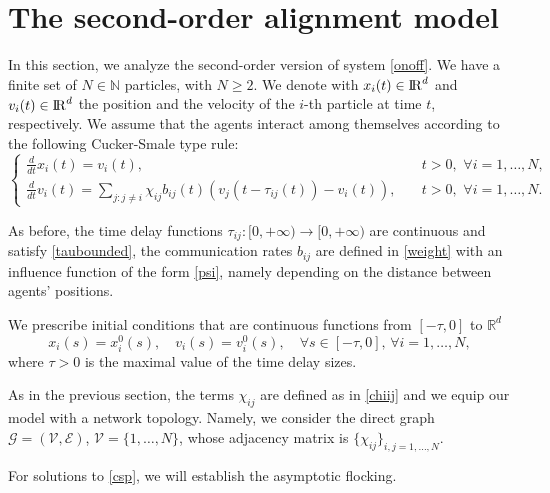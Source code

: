 \documentclass[11pt]{article}
\newcommand{\N}{\mathbb N}
\newcommand{\RR}{{{\rm I} \kern -.15em {\rm R} }}
\begin{document}
\section{The second-order alignment\label{4} model}\label{secdelay}
\setcounter{equation}{0}
	In this section, we analyze the second-order version of system \eqref{onoff}. We have a finite set of $N\in\N$ particles, with $N\geq 2 $. We denote with $x_{i}(t)\in \RR^d$ and $v_{i}(t)\in \RR^d$ the position and the velocity of the $i$-th particle at time $t$, respectively. We assume that the agents interact among themselves according to the following Cucker-Smale type rule:
	\begin{equation}\label{csp}
		\begin{cases}
			\frac{d}{dt}x_{i}(t)=v_{i}(t),\quad &t>0, \,\,\forall i=1,\dots,N,\\\frac{d}{dt}v_{i}(t)=\underset{j:j\neq i}{\sum}\chi_{ij}b_{ij}(t)(v_{j}(t-\tau_{ij}(t))-v_{i}(t)),\quad 	&t>0,\,\,\forall i=1,\dots,N.
		\end{cases}
	\end{equation}
	
	
	As before, the time delay functions $\tau_{ij}:[0,+\infty)\rightarrow[0,+\infty)$ are continuous and satisfy \eqref{taubounded}, the communication rates $b_{ij}$ are defined in \eqref{weight} with an influence function of the form \eqref{psi}, namely depending on the distance between agents' positions. 
	
	We prescribe initial conditions that are continuous functions from $[-\tau,0]$ to $\mathbb{R}^d$
	\begin{equation}\label{incondcs}
		x_{i}(s)=x^{0}_{i}(s),\quad v_{i}(s)=v^{0}_{i}(s), \quad \forall s\in [-\tau,0],\,\forall i=1,\dots,N,
	\end{equation}
	where $\tau>0$ is the maximal value of the time delay sizes. 
	
    \vspace{0.1cm}

    As in the previous section, the terms $\chi_{ij}$ are defined as in \eqref{chiij} and we equip our model with a network topology. Namely, we consider the direct graph $\mathcal{G}=(\mathcal{V},\mathcal{E})$, $\mathcal{V}=\{1,\dots,N\}$, whose adjacency matrix is $\{\chi_{ij} \}_{i,j=1,\dots,N}$. 
    
    \vspace{0.1cm}
    
    For solutions to \eqref{csp}, we will establish the asymptotic flocking. 
    
\end{document}
